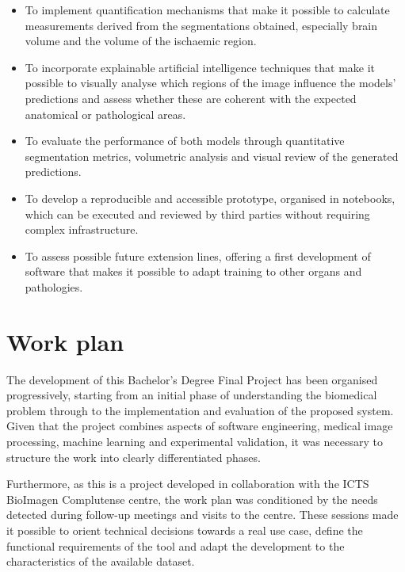 \begin{itemize}
    \item[\textbf{O10.}] To implement quantification mechanisms that make it possible to calculate measurements derived from the segmentations obtained, especially brain volume and the volume of the ischaemic region.

    \item[\textbf{O11.}] To incorporate explainable artificial intelligence techniques that make it possible to visually analyse which regions of the image influence the models' predictions and assess whether these are coherent with the expected anatomical or pathological areas.

    \item[\textbf{O12.}] To evaluate the performance of both models through quantitative segmentation metrics, volumetric analysis and visual review of the generated predictions.

    \item[\textbf{O13.}] To develop a reproducible and accessible prototype, organised in notebooks, which can be executed and reviewed by third parties without requiring complex infrastructure.

    \item[\textbf{O14.}] To assess possible future extension lines, offering a first development of software that makes it possible to adapt training to other organs and pathologies.
\end{itemize}

\section*{Work plan}

The development of this Bachelor's Degree Final Project has been organised progressively, starting from an initial phase of understanding the biomedical problem through to the implementation and evaluation of the proposed system. Given that the project combines aspects of software engineering, medical image processing, machine learning and experimental validation, it was necessary to structure the work into clearly differentiated phases.

Furthermore, as this is a project developed in collaboration with the ICTS BioImagen Complutense centre, the work plan was conditioned by the needs detected during follow-up meetings and visits to the centre. These sessions made it possible to orient technical decisions towards a real use case, define the functional requirements of the tool and adapt the development to the characteristics of the available dataset.


